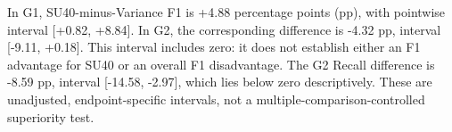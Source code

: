 In G1, SU40-minus-Variance F1 is +4.88 percentage points (pp), with pointwise interval [+0.82, +8.84]. In G2, the corresponding difference is -4.32 pp, interval [-9.11, +0.18]. This interval includes zero: it does not establish either an F1 advantage for SU40 or an overall F1 disadvantage. The G2 Recall difference is -8.59 pp, interval [-14.58, -2.97], which lies below zero descriptively. These are unadjusted, endpoint-specific intervals, not a multiple-comparison-controlled superiority test.
